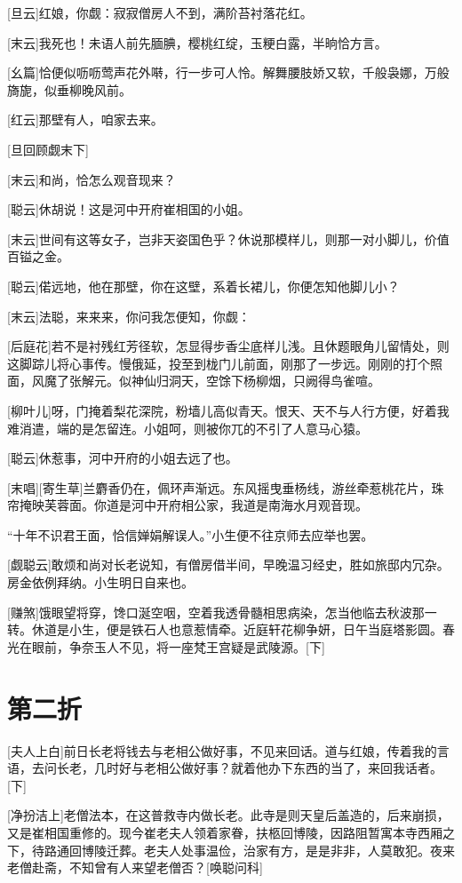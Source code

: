 \documentclass{book}
\newcommand\nchapter[1]{\chapter*{#1}\markboth{#1}{}\addcontentsline{toc}{chapter}{#1}}
\begin{document}
[旦云]红娘，你觑：寂寂僧房人不到，满阶苔衬落花红。

[末云]我死也！未语人前先腼腆，樱桃红绽，玉粳白露，半晌恰方言。

[幺篇]恰便似呖呖莺声花外啭，行一步可人怜。解舞腰肢娇又软，千般袅娜，万般旖旎，似垂柳晚风前。

[红云]那壁有人，咱家去来。

[旦回顾觑末下]

[末云]和尚，恰怎么观音现来？

[聪云]休胡说！这是河中开府崔相国的小姐。

[末云]世间有这等女子，岂非天姿国色乎？休说那模样儿，则那一对小脚儿，价值百镒之金。

[聪云]偌远地，他在那壁，你在这壁，系着长裙儿，你便怎知他脚儿小？

[末云]法聪，来来来，你问我怎便知，你觑：

[后庭花]若不是衬残红芳径软，怎显得步香尘底样儿浅。且休题眼角儿留情处，则这脚踪儿将心事传。慢俄延，投至到栊门儿前面，刚那了一步远。刚刚的打个照面，风魔了张解元。似神仙归洞天，空馀下杨柳烟，只阙得鸟雀喧。

[柳叶儿]呀，门掩着梨花深院，粉墙儿高似青天。恨天、天不与人行方便，好着我难消遣，端的是怎留连。小姐呵，则被你兀的不引了人意马心猿。

[聪云]休惹事，河中开府的小姐去远了也。

[末唱][寄生草]兰麝香仍在，佩环声渐远。东风摇曳垂杨线，游丝牵惹桃花片，珠帘掩映芙蓉面。你道是河中开府相公家，我道是南海水月观音现。

``十年不识君王面，恰信婵娟解误人。''小生便不往京师去应举也罢。

[觑聪云]敢烦和尚对长老说知，有僧房借半间，早晚温习经史，胜如旅邸内冗杂。房金依例拜纳。小生明日自来也。

[赚煞]饿眼望将穿，馋口涎空咽，空着我透骨髓相思病染，怎当他临去秋波那一转。休道是小生，便是铁石人也意惹情牵。近庭轩花柳争妍，日午当庭塔影圆。春光在眼前，争奈玉人不见，将一座梵王宫疑是武陵源。[下]

\nchapter{第二折}

[夫人上白]前日长老将钱去与老相公做好事，不见来回话。道与红娘，传着我的言语，去问长老，几时好与老相公做好事？就着他办下东西的当了，来回我话者。[下]

[净扮洁上]老僧法本，在这普救寺内做长老。此寺是则天皇后盖造的，后来崩损，又是崔相国重修的。现今崔老夫人领着家眷，扶柩回博陵，因路阻暂寓本寺西厢之下，待路通回博陵迁葬。老夫人处事温俭，治家有方，是是非非，人莫敢犯。夜来老僧赴斋，不知曾有人来望老僧否？[唤聪问科]
\end{document}
